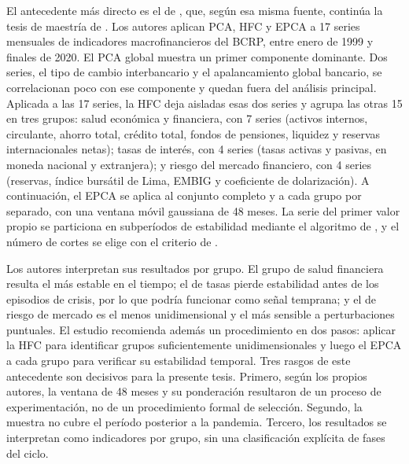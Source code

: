 El antecedente más directo es el de
\textcite{camiz_cerda_atoche_2026}, que,
según esa misma fuente, continúa la tesis de maestría de
\textcite{atoche_murrieta_2022}. Los autores aplican PCA, HFC y EPCA a 17
series mensuales de indicadores macrofinancieros del BCRP, entre enero de 1999 y finales de 2020.
El PCA global muestra un primer componente dominante. Dos series, el tipo de cambio interbancario
y el apalancamiento global bancario, se correlacionan poco con ese componente y quedan fuera del
análisis principal. Aplicada a las 17 series, la HFC deja aisladas esas dos series y agrupa las
otras 15 en tres grupos: salud económica y financiera, con 7 series (activos internos,
circulante, ahorro total, crédito total, fondos de pensiones, liquidez y reservas internacionales
netas); tasas de interés, con 4 series (tasas activas y pasivas, en moneda nacional y
extranjera); y riesgo del mercado financiero, con 4 series (reservas, índice bursátil de Lima,
EMBIG y coeficiente de dolarización). A continuación, el EPCA se aplica al conjunto completo y a cada
grupo por separado, con una ventana móvil gaussiana de 48 meses. La serie del primer valor propio
se particiona en subperíodos de estabilidad mediante el algoritmo de
\textcite{fisher_1958}, y el número de cortes se
elige con el criterio de \textcite{calinski_harabasz_1974}.

Los autores interpretan sus resultados por grupo. El grupo de salud financiera resulta el más
estable en el tiempo; el de tasas pierde estabilidad antes de los episodios de crisis, por lo que
podría funcionar como señal temprana; y el de riesgo de mercado es el menos unidimensional y el
más sensible a perturbaciones puntuales. El estudio recomienda además un procedimiento en dos
pasos: aplicar la HFC para identificar grupos suficientemente unidimensionales y luego el EPCA a
cada grupo para verificar su estabilidad temporal. Tres rasgos de este antecedente son decisivos
para la presente tesis. Primero, según los propios autores, la ventana de 48 meses y su
ponderación resultaron de un proceso de experimentación, no de un procedimiento formal de
selección. Segundo, la muestra no cubre el período posterior a la pandemia. Tercero, los
resultados se interpretan como indicadores por grupo, sin una clasificación explícita de fases
del ciclo.


